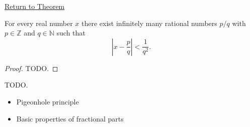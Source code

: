 \newpage
{}
\label{prf:dirichlet-approx}

\begin{remark*}[Return]
\hyperref[thm:dirichlet-approx]{Return to Theorem}
\end{remark*}

\begin{theorem*}
For every real number $x$ there exist infinitely many rational numbers $p/q$
with $p\in\mathbb{Z}$ and $q\in\mathbb{N}$ such that
\[
\left|x-\frac{p}{q}\right|<\frac{1}{q^2}.
\]
\end{theorem*}

\begin{proof}
TODO.
\end{proof}

\begin{remark*}
TODO.
\end{remark*}

\begin{dependencies}
\begin{itemize}
  \item Pigeonhole principle
  \item Basic properties of fractional parts
\end{itemize}
\end{dependencies}


